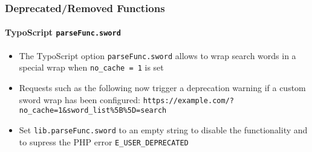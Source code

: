 %

\begin{frame}[fragile]
	\frametitle{Deprecated/Removed Functions}
	\framesubtitle{TypoScript \texttt{parseFunc.sword}}


	\begin{itemize}
		\item The TypoScript option \texttt{parseFunc.sword} allows to wrap search
			words in a special wrap when \texttt{no\_cache = 1} is set
		\item Requests such as the following now trigger a deprecation warning
			if a custom sword wrap has been configured:\newline
			\smaller\texttt{https://example.com/?no\_cache=1\&sword\_list\%5B\%5D=search}\normalsize
		\item Set \texttt{lib.parseFunc.sword} to an empty string to disable
			the functionality and to supress the PHP error \texttt{E\_USER\_DEPRECATED}
	\end{itemize}

\end{frame}

